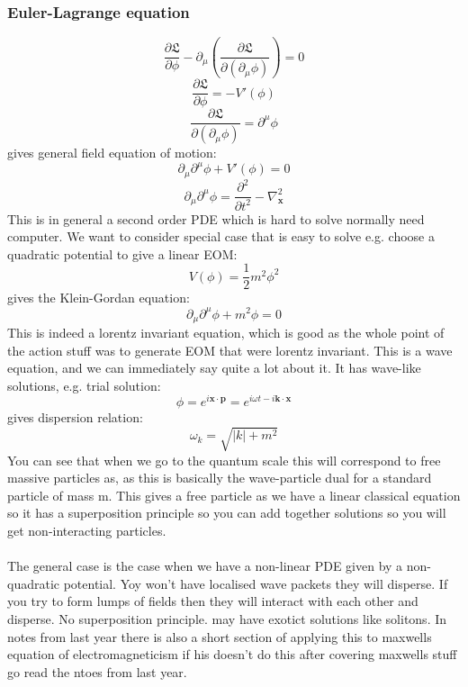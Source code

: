 \documentclass[12pt, a4paper, twoside, titlepage]{article}
\begin{document}
\subsubsection{Euler-Lagrange equation}
\begin{equation}
        \frac{\partial \mathfrak{L}}{\partial \phi} - \partial_{\mu} \left( \frac{\partial \mathfrak{L}}{ \partial(\partial_{\mu} \phi) } \right) = 0 
\end{equation}
$$
\frac{\partial \mathfrak{L} }{\partial \phi} = - V'(\phi)
$$
$$
\frac{\partial \mathfrak{L}}{\partial (\partial_{\mu} \phi)} = \partial^{\mu}\phi
$$
gives general field equation of motion:
\begin{equation}
\partial_{\mu}\partial^{\mu} \phi + V'(\phi)  =0
\end{equation}
$$
\partial_{\mu}\partial^{\mu} \phi = \frac{\partial^2}{\partial t^2} - \nabla^2_{\bm x}
$$
This is in general a second order PDE which is hard to solve normally need computer. We want to consider special case that is easy to solve e.g. choose a quadratic potential to give a linear EOM:
$$
V(\phi) = \frac{1}{2} m^2 \phi^2
$$
gives the Klein-Gordan equation:
\begin{equation}
\partial_{\mu}\partial^{\mu} \phi + m^2\phi  =0
\end{equation}
This is indeed a lorentz invariant equation, which is good as the whole point of the action stuff was to generate EOM that were lorentz invariant. This is a wave equation, and we can immediately say quite a lot about it. It has wave-like solutions, e.g. trial solution:
$$
\phi = e^{i \bm x \cdot \bm p} = e^{i\omega t - i \bm k \cdot \bm x}
$$
gives dispersion relation:
$$
\omega_k = \sqrt{|k| + m^2}
$$
You can see that when we go to the quantum scale this will correspond to free massive particles as, as this is basically the wave-particle dual for a standard particle of mass m. This gives a free particle as we have a linear classical equation so it has a superposition principle so you can add together solutions so you will get non-interacting particles. \\\\
The general case is the case when we have a non-linear PDE given by a non-quadratic potential. Yoy won't have localised wave packets they will disperse. If you try to form lumps of fields then they will interact with each other and disperse. No superposition principle. may have exotict solutions like solitons. In notes from last year there is also a short section of applying this to maxwells equation of electromagneticism if his doesn't do this after covering maxwells stuff go read the ntoes from last year.
\end{document}
